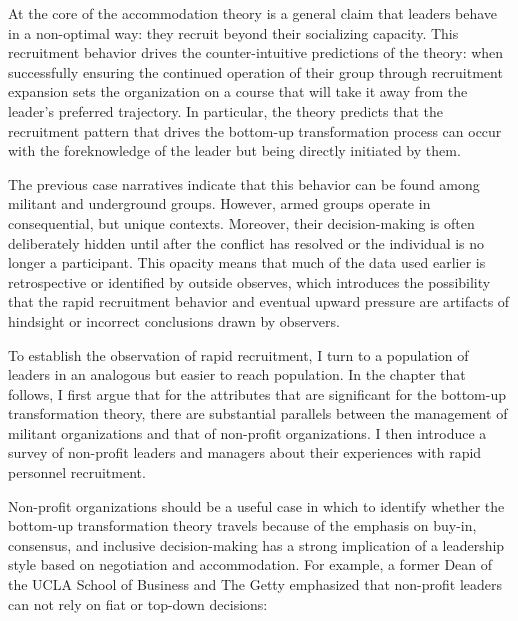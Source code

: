 At the core of the accommodation theory is a general claim that leaders behave in a non-optimal way: they recruit beyond their socializing capacity. This recruitment behavior drives the counter-intuitive predictions of the theory: when successfully ensuring the continued operation of their group through recruitment expansion sets the organization on a course that will take it away from the leader’s preferred trajectory. In particular, the theory predicts that the recruitment pattern that drives the bottom-up transformation process can occur with the foreknowledge of the leader but being directly initiated by them.

The previous case narratives indicate that this behavior can be found among militant and underground groups. However, armed groups operate in consequential, but unique contexts. Moreover, their decision-making is often deliberately hidden until after the conflict has resolved or the individual is no longer a participant. This opacity means that much of the data used earlier is retrospective or identified by outside observes, which introduces the possibility that the rapid recruitment behavior and eventual upward pressure are artifacts of hindsight or incorrect conclusions drawn by observers.  

To establish the observation of rapid recruitment, I turn to a population of leaders in an analogous but easier to reach population. In the chapter that follows, I first argue that for the attributes that are significant for the bottom-up transformation theory, there are substantial parallels between the management of militant organizations and that of non-profit organizations. I then introduce a survey of non-profit leaders and managers about their experiences with rapid personnel recruitment.

Non-profit organizations should be a useful case in which to identify whether the bottom-up transformation theory travels because of the emphasis on buy-in, consensus, and inclusive decision-making has a strong implication of a leadership style based on negotiation and accommodation. For example, a former Dean of the UCLA School of Business and The Getty emphasized that non-profit leaders can not rely on fiat or top-down decisions:

~\autocite[7]{taliento2005corporate}

